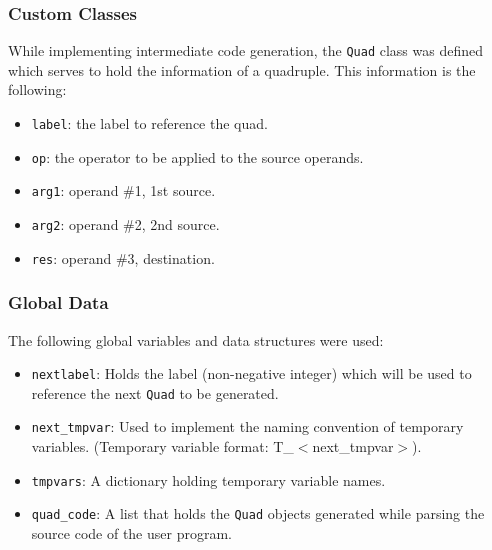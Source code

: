 \documentclass{article}
\def\code#1{\texttt{#1}} %
\begin{document}
\subsubsection{Custom Classes}
While implementing intermediate code generation, the \code{Quad} class was defined which
serves to hold the information of a quadruple. This information is the following:
\begin{itemize}
 \item \code{label}: the label to reference the quad.
 \item \code{op}: the operator to be applied to the source operands.
 \item \code{arg1}: operand \#1, 1st source.
 \item \code{arg2}: operand \#2, 2nd source.
 \item \code{res}: operand \#3, destination.
\end{itemize}

\subsubsection{Global Data}
The following global variables and data structures were used:
\begin{itemize}
 \item \code{nextlabel}: Holds the label (non-negative integer) which will be used to reference
                         the next \code{Quad} to be generated.
 \item \code{next\_tmpvar}: Used to implement the naming convention of temporary variables.
                            (Temporary variable format: T\_$<$next\_tmpvar$>$).
 \item \code{tmpvars}: A dictionary holding temporary variable names.
 \item \code{quad\_code}: A list that holds the \code{Quad} objects generated while parsing
                          the source code of the user program.
\end{itemize}

\newpage
\end{document}

